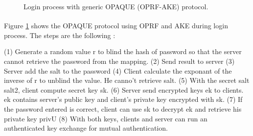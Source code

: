 \documentclass[../report.tex]{subfiles}
\begin{document}
\begin{figure}[h]
 \centering

 \setlength{\fboxsep}{10pt}
 \setlength{\fboxrule}{1pt}

 \caption{Login process with generic OPAQUE (OPRF-AKE) protocol.}
 \label{fig:OPAQUE_AKE}
\end{figure}




\paragraph{}

Figure \ref{fig:OPAQUE_AKE} shows the OPAQUE protocol using OPRF and AKE during login process.
The steps are the following :

(1) Generate a random value r to blind the hash of password so that the server cannot retrieve the password from the mapping.
(2) Send result to server
(3) Server add the salt to the password
(4) Client calculate the exponant of the inverse of r to unblind the value. He canno't retrieve salt.
(5) With the secret salt salt2, client compute secret key sk.
(6) Server send encrypted keys ek to clients. ek contains server's public key and client's private key encrypted with sk.
(7) If the password entered is correct, client can use sk to decrypt ek and retrieve his private key privU
(8) With both keys, clients and server can run an authenticated key exchange for mutual authentication.
\end{document}
